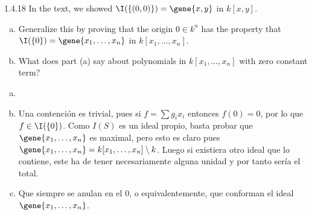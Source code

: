 \documentclass[twoside]{article}
\begin{document}
\newpage

\begin{ejercicio}{1.4.18}
In the text, we showed $\I(\{(0,0)\}) = \gene{x,y}$ in $k[x,y]$. 
\begin{enumerate}[a.]
\item Generalize this by proving that the origin $0\in k^n$ has the property that $\I(\{0\}) = \gene{x_1,\dotsc,x_n}$ in $k[x_1,\dotsc,x_n]$.
\item What does part (a) say about polynomials in $k[x_1,\dotsc,x_n]$ with zero constant term?
\end{enumerate}
\end{ejercicio}
\begin{solucion}
\begin{enumerate}[a.]
\item[]
\item Una contención es trivial, pues si $f= \sum g_i x_i$ entonces  $f(0)=0$, por lo que $f\in \I(\{0\})$. Como $I(S)$ es un ideal propio, basta probar que $\gene{x_1,\dotsc,x_n}$ es maximal, pero esto es claro pues $\gene{x_1,\dotsc,x_n} = k[x_1,\dotsc,x_n]\setminus k$. Luego si existiera otro ideal que lo contiene, este ha de tener necesariamente alguna unidad y por tanto sería el total.
\item Que siempre se anulan en el 0, o equivalentemente, que conforman el ideal $\gene{x_1,\dotsc,x_n}$.

\end{enumerate}
\end{solucion}
\end{document}
